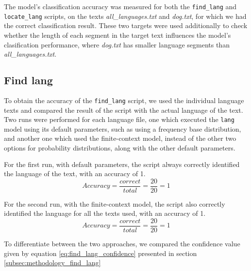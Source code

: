 \documentclass{article}
\begin{document}
The model's classification accuracy was measured for both the \texttt{find_lang} and \texttt{locate_lang} scripts, on the texts \textit{all\_languages.txt} and \textit{dog.txt}, for which we had the correct classification result.
These two targets were used additionally to check whether the length of each segment in the target text influences the model's clasification performance, where \textit{dog.txt} has smaller language segments than \textit{all\_languages.txt}.


\subsection{Find lang}
\label{subsec:results_find_lang}

To obtain the accuracy of the \texttt{find_lang} script, we used the individual language texts and compared the result of the script with the actual language of the text.
Two runs were performed for each language file, one which executed the \texttt{lang} model using its default parameters, such as using a frequency base distribution,
and another one which used the finite-context model, instead of the other two options for probability distributions, along with the other default parameters.

For the first run, with default parameters, the script always correctly identified the language of the text, with an accuracy of 1.
\begin{equation}
    \label{eq:find_lang_default_accuracy}
    Accuracy = \frac{correct}{total} = \frac{20}{20} = 1
\end{equation}

For the second run, with the finite-context model, the script also correctly identified the language for all the texts used, with an accuracy of 1.
\begin{equation}
    \label{eq:find_lang_finite_context_accuracy}
    Accuracy = \frac{correct}{total} = \frac{20}{20} = 1
\end{equation}

To differentiate between the two approaches, we compared the confidence value given by equation \ref{eq:find_lang_confidence} presented in section \ref{subsec:methodology_find_lang}
\end{document}
